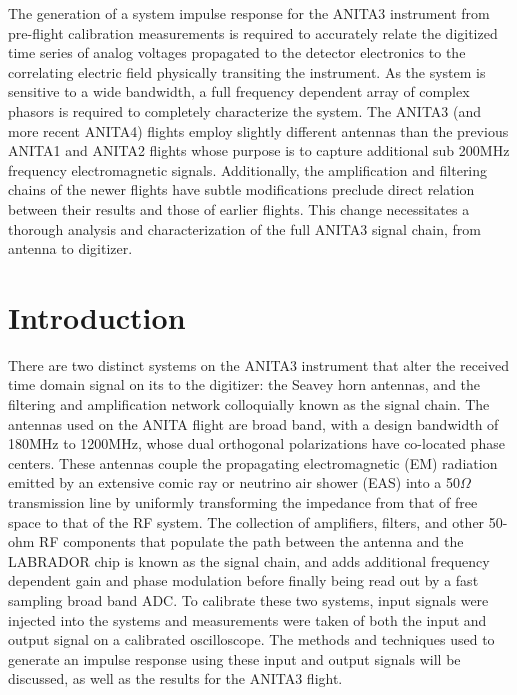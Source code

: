%
%
%
%


	The generation of a system impulse response for the ANITA3 instrument from pre-flight calibration measurements is required to accurately relate the digitized time series of analog voltages propagated to the detector electronics to the correlating electric field physically transiting the instrument.  As the system is sensitive to a wide bandwidth, a full frequency dependent array of complex phasors is required to completely characterize the system.  The ANITA3 (and more recent ANITA4) flights employ slightly different antennas than the previous ANITA1 and ANITA2 flights whose purpose is to capture additional sub 200MHz frequency electromagnetic signals. Additionally, the amplification and filtering chains of the newer flights have subtle modifications preclude direct relation between their results and those of earlier flights.  This change necessitates a thorough analysis and characterization of the full ANITA3 signal chain, from antenna to digitizer.
	
\section{Introduction}

	There are two distinct systems on the ANITA3 instrument that alter the received time domain signal on its to the digitizer: the Seavey horn antennas, and the filtering and amplification network colloquially known as the signal chain.  The antennas used on the ANITA flight are broad band, with a design bandwidth of 180MHz to 1200MHz, whose dual orthogonal polarizations have co-located phase centers.  These antennas couple the propagating electromagnetic (EM) radiation emitted by an extensive comic ray or neutrino air shower (EAS) into a 50$\Omega$ transmission line by uniformly transforming the impedance from that of free space to that of the RF system.  The collection of amplifiers, filters, and other 50-ohm RF components that populate the path between the antenna and the LABRADOR chip is known as the signal chain, and adds additional frequency dependent gain and phase modulation before finally being read out by a fast sampling broad band ADC.  To calibrate these two systems, input signals were injected into the systems and measurements were taken of both the input and output signal on a calibrated oscilloscope.  The methods and techniques used to generate an impulse response using these input and output signals will be discussed, as well as the results for the ANITA3 flight.

